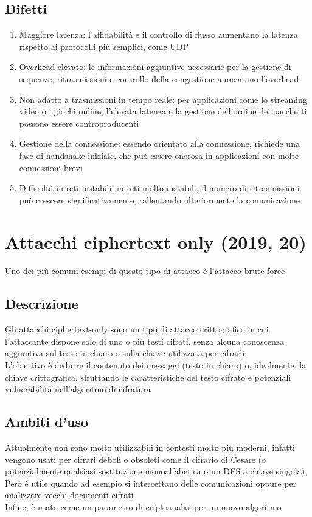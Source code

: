 \documentclass[10pt,oneside,a4paper]{article}
\begin{document}
\subsection{Difetti}
\begin{enumerate}
\item Maggiore latenza: l'affidabilità e il controllo di flusso aumentano la latenza rispetto ai protocolli più semplici, come UDP
\item Overhead elevato: le informazioni aggiuntive necessarie per la gestione di sequenze, ritrasmissioni e controllo della congestione aumentano l'overhead
\item Non adatto a trasmissioni in tempo reale: per applicazioni come lo streaming video o i giochi online, l'elevata latenza e la gestione dell'ordine dei pacchetti possono essere controproducenti
\item Gestione della connessione: essendo orientato alla connessione, richiede una fase di handshake iniziale, che può essere onerosa in applicazioni con molte connessioni brevi
\item Difficoltà in reti instabili: in reti molto instabili, il numero di ritrasmissioni può crescere significativamente, rallentando ulteriormente la comunicazione
\end{enumerate}
\section{Attacchi ciphertext only (2019, 20)}
Uno dei più comuni esempi di questo tipo di attacco è l'attacco brute-force
\subsection{Descrizione}
Gli attacchi ciphertext-only sono un tipo di attacco crittografico in cui l'attaccante dispone solo di uno o più testi cifrati, senza alcuna conoscenza aggiuntiva sul testo in chiaro o sulla chiave utilizzata per cifrarli\\
L'obiettivo è dedurre il contenuto dei messaggi (testo in chiaro) o, idealmente, la chiave crittografica, sfruttando le caratteristiche del testo cifrato e potenziali vulnerabilità nell'algoritmo di cifratura
\subsection{Ambiti d'uso}
Attualmente non sono molto utilizzabili in contesti molto più moderni, infatti vengono usati per cifrari deboli o obsoleti come il cifrario di Cesare (o potenzialmente qualsiasi sostituzione monoalfabetica o un DES a chiave singola),\\
Però è utile quando ad esempio si intercettano delle comunicazioni oppure per analizzare vecchi documenti cifrati\\
Infine, è usato come un parametro di criptoanalisi per un nuovo algoritmo
\end{document}
